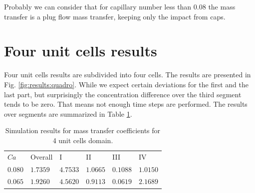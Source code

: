 \documentclass{article}
\begin{document}
{\color{red} Probably we can consider that for capillary number less than $0.08$ the mass transfer
is a plug flow mass transfer, keeping only the impact from caps.}

\section{Four unit cells results}
Four unit cells results are subdivided into four cells. The results are presented in Fig.
\ref{fig:results:quadro}. While we expect certain deviations for the first and the last part, but
surprisingly the concentration difference over the third segment tends to be zero. That means not
enough time steps are performed. The results over segments are summarized in Table
\ref{table:four_units}.
\begin{table}[htb!]
\begin{tabularx}{\textwidth}{|X|X|X|X|X|X|}
\hline
$Ca$   &Overall  &I       &II      &III     &IV\\
$0.080$&$1.7359$ &$4.7533$&$1.0665$&$0.1088$&$1.0150$\\
$0.065$&$1.9260$ &$4.5620$&$0.9113$&$0.0619$&$2.1689$\\
\hline
\end{tabularx}
\caption{Simulation results for mass transfer coefficients for 4 unit cells
domain.\label{table:four_units}}
\end{table}
\end{document}
